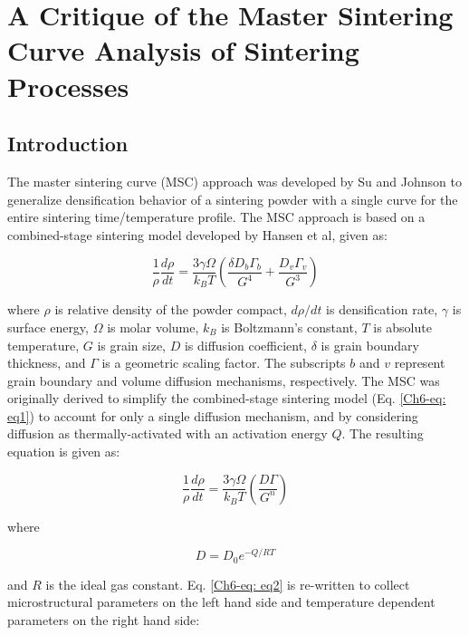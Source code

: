 \chapter{A Critique of the Master Sintering Curve Analysis of Sintering Processes}

\section{Introduction}
The master sintering curve (MSC) approach was developed by Su and Johnson \cite{Su1996} to generalize densification behavior of a sintering powder with a single curve for the entire sintering time/temperature profile. The MSC approach is based on a combined-stage sintering model developed by Hansen et al, \cite{Hansen1992} given as:

\begin{equation}
\label{Ch6-eq: eq1}
\frac{1}{\rho} \frac{d\rho}{dt} = \frac{3 \gamma \Omega}{k_{B}T} \left( \frac{\delta D_{b} \Gamma_{b}}{G^{4}} + \frac{D_{v} \Gamma_{v}}{G^{3}} \right)
\end{equation}

\noindent where $\rho$ is relative density of the powder compact, $d\rho/dt$ is densification rate, $\gamma$ is surface energy, $\Omega$ is molar volume, $k_{B}$ is Boltzmann's constant, $T$ is absolute temperature, $G$ is grain size, $D$ is diffusion coefficient, $\delta$ is grain boundary thickness, and $\Gamma$ is a geometric scaling factor. The subscripts $b$ and $v$ represent grain boundary and volume diffusion mechanisms, respectively. The MSC was originally derived to simplify the combined-stage sintering model (Eq. \ref{Ch6-eq: eq1}) to account for only a single diffusion mechanism, and by considering diffusion as thermally-activated with an activation energy $Q$. The resulting equation is given as:

\begin{equation}
\label{Ch6-eq: eq2}
\frac{1}{\rho} \frac{d\rho}{dt} = \frac{3 \gamma \Omega}{k_{B}T} \left( \frac{D \Gamma}{G^{n}} \right)
\end{equation}

\noindent where

\begin{equation}
\label{Ch6-eq: eq3}
D = D_{0}e^{-Q/RT}
\end{equation}

\noindent and $R$ is the ideal gas constant. Eq. \ref{Ch6-eq: eq2} is re-written to collect microstructural parameters on the left hand side and temperature dependent parameters on the right hand side:

